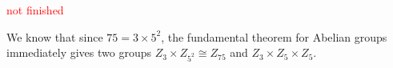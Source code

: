 \documentclass[12pt]{exam}
\theoremstyle{plain} %
\theoremstyle{definition} %
\theoremstyle{remark} %
\begin{document}
\begin{questions}
\begin{solution}
\begin{parts}
      \part
    \end{parts}
  \end{solution}

  \question
  \textcolor{red}{not finished}
  \begin{solution}
    We know that since $75 = 3\times5^2$, the fundamental theorem for
    Abelian groups immediately gives two groups $Z_3 \times Z_{5^2}
    \cong Z_{75}$ and $Z_3 \times Z_5 \times Z_5$.
  \end{solution}

\end{questions}
\printbibliography[heading=bibintoc]
\end{document}
